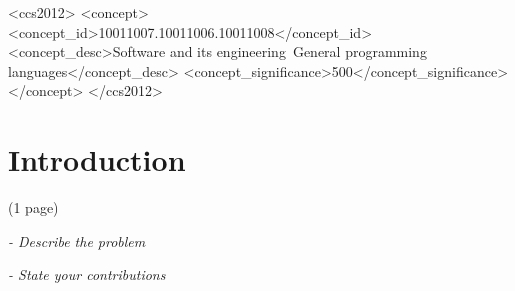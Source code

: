 \documentclass[acmsmall,review]{acmart}\settopmatter{printfolios=true,printccs=false,printacmref=false}
\begin{document}
\begin{abstract}
(4 sentences)

\textit{Text of abstract \ldots.}

\end{abstract}


\begin{CCSXML}
<ccs2012>
<concept>
<concept_id>10011007.10011006.10011008</concept_id>
<concept_desc>Software and its engineering~General programming languages</concept_desc>
<concept_significance>500</concept_significance>
</concept>
</ccs2012>
\end{CCSXML}





\maketitle


\section{Introduction}
(1 page)

\textit{- Describe the problem}

\textit{- State your contributions}
\end{document}
